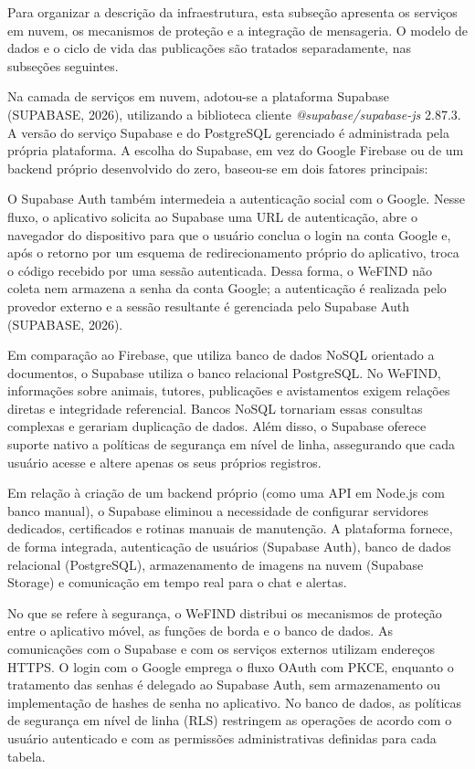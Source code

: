 Para organizar a descrição da infraestrutura, esta subseção apresenta os serviços em nuvem, os mecanismos de proteção e a integração de mensageria. O modelo de dados e o ciclo de vida das publicações são tratados separadamente, nas subseções seguintes.

Na camada de serviços em nuvem, adotou-se a plataforma Supabase (SUPABASE, 2026), utilizando a biblioteca cliente \textit{@supabase/supabase-js} 2.87.3. A versão do serviço Supabase e do PostgreSQL gerenciado é administrada pela própria plataforma. A escolha do Supabase, em vez do Google Firebase ou de um backend próprio desenvolvido do zero, baseou-se em dois fatores principais:

O Supabase Auth também intermedeia a autenticação social com o Google. Nesse fluxo, o aplicativo solicita ao Supabase uma URL de autenticação, abre o navegador do dispositivo para que o usuário conclua o login na conta Google e, após o retorno por um esquema de redirecionamento próprio do aplicativo, troca o código recebido por uma sessão autenticada. Dessa forma, o WeFIND não coleta nem armazena a senha da conta Google; a autenticação é realizada pelo provedor externo e a sessão resultante é gerenciada pelo Supabase Auth (SUPABASE, 2026).

Em comparação ao Firebase, que utiliza banco de dados NoSQL orientado a documentos, o Supabase utiliza o banco relacional PostgreSQL. No WeFIND, informações sobre animais, tutores, publicações e avistamentos exigem relações diretas e integridade referencial. Bancos NoSQL tornariam essas consultas complexas e gerariam duplicação de dados. Além disso, o Supabase oferece suporte nativo a políticas de segurança em nível de linha, assegurando que cada usuário acesse e altere apenas os seus próprios registros.

Em relação à criação de um backend próprio (como uma API em Node.js com banco manual), o Supabase eliminou a necessidade de configurar servidores dedicados, certificados e rotinas manuais de manutenção. A plataforma fornece, de forma integrada, autenticação de usuários (Supabase Auth), banco de dados relacional (PostgreSQL), armazenamento de imagens na nuvem (Supabase Storage) e comunicação em tempo real para o chat e alertas.

No que se refere à segurança, o WeFIND distribui os mecanismos de proteção entre o aplicativo móvel, as funções de borda e o banco de dados. As comunicações com o Supabase e com os serviços externos utilizam endereços HTTPS. O login com o Google emprega o fluxo OAuth com PKCE, enquanto o tratamento das senhas é delegado ao Supabase Auth, sem armazenamento ou implementação de hashes de senha no aplicativo. No banco de dados, as políticas de segurança em nível de linha (RLS) restringem as operações de acordo com o usuário autenticado e com as permissões administrativas definidas para cada tabela.

